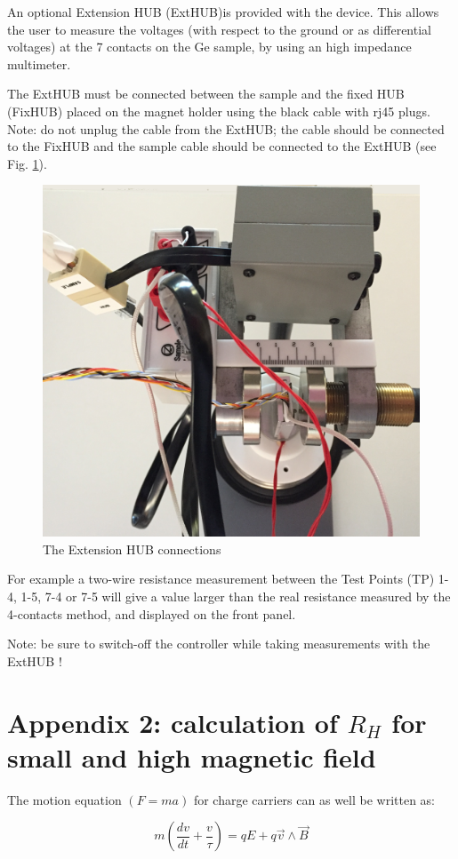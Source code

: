 \documentclass[]{book}
\begin{document}
An optional Extension HUB (ExtHUB)is provided with the device. This
allows the user to measure the voltages (with respect to the ground or
as differential voltages) at the 7 contacts on the Ge sample, by using
an high impedance multimeter.

The ExtHUB must be connected between the sample and the fixed HUB
(FixHUB) placed on the magnet holder using the black cable with rj45
plugs. Note: do not unplug the cable from the ExtHUB; the cable should
be connected to the FixHUB and the sample cable should be connected to
the ExtHUB (see Fig. \ref{fig:ExtensionHUB}).

\begin{figure}

{\centering \includegraphics[width=0.4\linewidth]{Assets/Figures/imageExtensionHub} 

}

\caption{The Extension HUB connections}\label{fig:ExtensionHUB}
\end{figure}

For example a two-wire resistance measurement between the Test Points
(TP) 1-4, 1-5, 7-4 or 7-5 will give a value larger than the real
resistance measured by the 4-contacts method, and displayed on the front
panel.

Note: be sure to switch-off the controller while taking measurements
with the ExtHUB !

\chapter{\texorpdfstring{Appendix 2: calculation of \(R_H\) for small
and high magnetic
field}{Appendix 2: calculation of R\_H for small and high magnetic field}}\label{appendix-2-calculation-of-r_h-for-small-and-high-magnetic-field}

The motion equation \((F=ma)\) for charge carriers can as well be
written as:

\begin{equation}
m(\frac{dv}{dt}+\frac{v}{\tau}) = qE+ q\vec{v} \wedge \vec{B} 
\label{eq:MotionEquationForChargeCarriers}
\end{equation}
\end{document}
